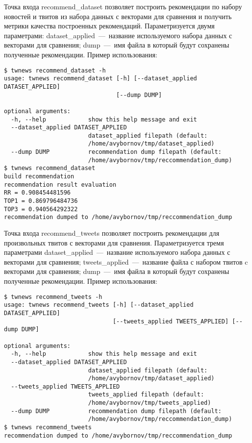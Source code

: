         Точка входа recommend\_dataset позволяет построить рекомендации по набору новостей и твитов из набора данных с векторами для сравнения
        и получить метрики качества построенных рекомендаций.
        Параметризуется двумя параметрами:
        dataset\_applied~---~название используемого набора данных с векторами для сравнения;
        dump~---~имя файла в который будут сохранены полученные рекомендации.
        Пример использования:
        \begin{lstlisting}
$ twnews recommend_dataset -h
usage: twnews recommend_dataset [-h] [--dataset_applied DATASET_APPLIED]
                                [--dump DUMP]

optional arguments:
  -h, --help            show this help message and exit
  --dataset_applied DATASET_APPLIED
                        dataset_applied filepath (default:
                        /home/avybornov/tmp/dataset_applied)
  --dump DUMP           recommendation dump filepath (default:
                        /home/avybornov/tmp/reccommendation_dump)
$ twnews recommend_dataset
build recommendation
recommendation result evaluation
RR = 0.908454481596
TOP1 = 0.869796484736
TOP3 = 0.940564292322
recommendation dumped to /home/avybornov/tmp/reccommendation_dump
        \end{lstlisting}


        Точка входа recommend\_tweets позволяет построить рекомендации для произвольных твитов с векторами для сравнения.
        Параметризуется тремя параметрами
        dataset\_applied~---~название используемого набора данных с векторами для сравнения;
        tweets\_applied~---~название файла с набором твитов c векторами для сравнения;
        dump~---~имя файла в который будут сохранены полученные рекомендации.
        Пример использования:
        \begin{lstlisting}
$ twnews recommend_tweets -h
usage: twnews recommend_tweets [-h] [--dataset_applied DATASET_APPLIED]
                               [--tweets_applied TWEETS_APPLIED] [--dump DUMP]

optional arguments:
  -h, --help            show this help message and exit
  --dataset_applied DATASET_APPLIED
                        dataset_applied filepath (default:
                        /home/avybornov/tmp/dataset_applied)
  --tweets_applied TWEETS_APPLIED
                        tweets_applied filepath (default:
                        /home/avybornov/tmp/tweets_applied)
  --dump DUMP           recommendation dump filepath (default:
                        /home/avybornov/tmp/reccommendation_dump)
$ twnews recommend_tweets
recommendation dumped to /home/avybornov/tmp/reccommendation_dump

        \end{lstlisting}


